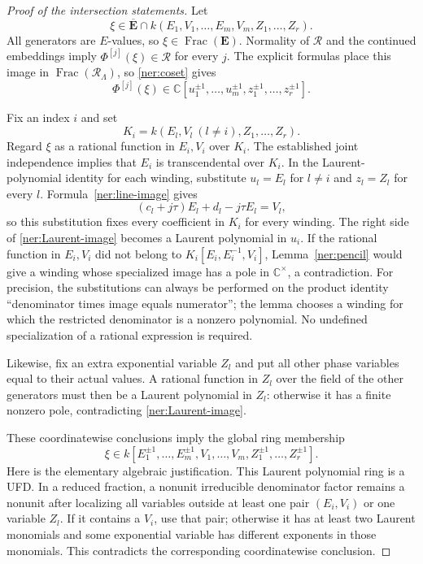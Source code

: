 \documentclass[11pt]{article}
\theoremstyle{definition}
\theoremstyle{remark}
\newcommand{\E}{\mathbf E}
\newcommand{\Ebar}{\overline{\mathbf E}}
\begin{document}
\begin{proof}[Proof of the intersection statements]
Let
\[
 \xi\in\Ebar\cap k(E_1,V_1,\ldots,E_m,V_m,Z_1,\ldots,Z_r).
\]
All generators are $E$-values, so $\xi\in\operatorname{Frac}(\E)$.
Normality of $\mathcal R$ and the continued embeddings imply
$\Phi^{[j]}(\xi)\in\mathcal R$ for every $j$.
The explicit formulas place this image in
$\operatorname{Frac}(\mathcal R_\Lambda)$, so
\eqref{ner:coset} gives
\begin{equation}\label{ner:Laurent-image}
 \Phi^{[j]}(\xi)\in
 \mathbb C[u_1^{\pm1},\ldots,u_m^{\pm1},z_1^{\pm1},\ldots,z_r^{\pm1}].
\end{equation}

Fix an index $i$ and set
\[
 K_i=k(E_l,V_l\ (l\ne i),Z_1,\ldots,Z_r).
\]
Regard $\xi$ as a rational function in $E_i,V_i$ over $K_i$.
The established joint independence implies that $E_i$ is
transcendental over $K_i$.  In the Laurent-polynomial identity
for each winding, substitute $u_l=E_l$ for $l\ne i$ and
$z_l=Z_l$ for every $l$.  Formula~\eqref{ner:line-image} gives
\[
 (c_l+j\tau)E_l+d_l-j\tau E_l=V_l,
\]
so this substitution fixes every coefficient in $K_i$ for
every winding.  The right side of \eqref{ner:Laurent-image}
becomes a Laurent polynomial in $u_i$.
If the rational function in $E_i,V_i$ did not belong to
$K_i[E_i,E_i^{-1},V_i]$, Lemma~\ref{ner:pencil} would give
a winding whose specialized image has a pole in
$\mathbb C^\times$, a contradiction.
For precision, the substitutions can always be performed on
the product identity ``denominator times image equals
numerator''; the lemma chooses a winding for which the
restricted denominator is a nonzero polynomial.  No undefined
specialization of a rational expression is required.

Likewise, fix an extra exponential variable $Z_l$ and put all
other phase variables equal to their actual values.  A rational
function in $Z_l$ over the field of the other generators must
then be a Laurent polynomial in $Z_l$: otherwise it has a
finite nonzero pole, contradicting \eqref{ner:Laurent-image}.

These coordinatewise conclusions imply the global ring
membership
\[
 \xi\in k[E_1^{\pm1},\ldots,E_m^{\pm1},V_1,\ldots,V_m,
                                      Z_1^{\pm1},\ldots,Z_r^{\pm1}].
\]
Here is the elementary algebraic justification.  This Laurent
polynomial ring is a UFD.  In a reduced fraction, a nonunit
irreducible denominator factor remains a nonunit after
localizing all variables outside at least one pair $(E_i,V_i)$
or one variable $Z_l$.  If it contains a $V_i$, use that pair;
otherwise it has at least two Laurent monomials and some
exponential variable has different exponents in those monomials.
This contradicts the corresponding coordinatewise conclusion.


\end{proof}
\end{document}
